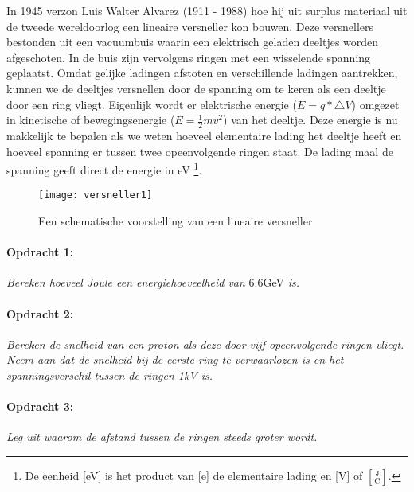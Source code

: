In 1945 verzon Luis Walter Alvarez (1911 - 1988) hoe hij uit surplus
materiaal uit de tweede wereldoorlog een lineaire versneller kon bouwen.
Deze versnellers bestonden uit een vacuumbuis waarin een elektrisch
geladen deeltjes worden afgeschoten. In de buis zijn vervolgens ringen
met een wisselende spanning geplaatst. Omdat gelijke ladingen afstoten
en verschillende ladingen aantrekken, kunnen we de deeltjes versnellen
door de spanning om te keren als een deeltje door een ring vliegt.
Eigenlijk wordt er elektrische energie ($E=q*\triangle V$) omgezet in
kinetische of bewegingsenergie ($E=\frac{1}{2}mv^{2}$) van het deeltje.
Deze energie is nu makkelijk te bepalen als we weten hoeveel elementaire
lading het deeltje heeft en hoeveel spanning er tussen twee
opeenvolgende ringen staat. De lading maal de spanning geeft direct de
energie in eV \footnote{De eenheid {[}eV{]} is het product van {[}e{]}
de elementaire lading en {[}V{]} of
$\left[\mathrm{\frac{J}{C}}\right]$.}.

\begin{figure}[h]
\noindent \begin{centering}
\texttt{[image: versneller1]}
\par\end{centering}

\caption{Een schematische voorstelling van een lineaire versneller}
\end{figure}



\paragraph*{Opdracht 1:}

\emph{Bereken hoeveel Joule een energiehoeveelheid van }6.6GeV\emph{
is.}


\paragraph*{Opdracht 2:}

\emph{Bereken de snelheid van een proton als deze door vijf opeenvolgende
ringen vliegt. Neem aan dat de snelheid bij de eerste ring te verwaarlozen
is en het spanningsverschil tussen de ringen 1kV is.}


\paragraph*{Opdracht 3:}

\emph{Leg uit waarom de afstand tussen de ringen steeds groter wordt.}

